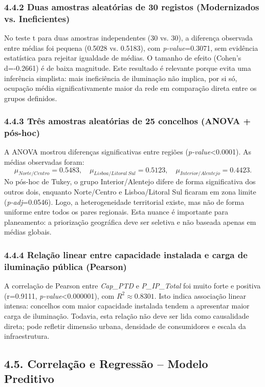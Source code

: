 \subsubsection{4.4.2 Duas amostras aleatórias de 30 registos (Modernizados vs. Ineficientes)}
No teste t para duas amostras independentes (30 vs. 30), a diferença observada entre médias foi pequena (0.5028 vs. 0.5183), com \textit{p-value}=0.3071, sem evidência estatística para rejeitar igualdade de médias. O tamanho de efeito (Cohen's d=-0.2661) é de baixa magnitude. Este resultado é relevante porque evita uma inferência simplista: mais ineficiência de iluminação não implica, por si só, ocupação média significativamente maior da rede em comparação direta entre os grupos definidos.

\subsubsection{4.4.3 Três amostras aleatórias de 25 concelhos (ANOVA + pós-hoc)}
A ANOVA mostrou diferenças significativas entre regiões (\textit{p-value}<0.0001). As médias observadas foram:
\[
\mu_{Norte/Centro} = 0.5483,\quad
\mu_{Lisboa/Litoral\ Sul} = 0.5123,\quad
\mu_{Interior/Alentejo} = 0.4423.
\]
No pós-hoc de Tukey, o grupo Interior/Alentejo difere de forma significativa dos outros dois, enquanto Norte/Centro e Lisboa/Litoral Sul ficaram em zona limite (\textit{p-adj}=0.0546). Logo, a heterogeneidade territorial existe, mas não de forma uniforme entre todos os pares regionais. Esta nuance é importante para planeamento: a priorização geográfica deve ser seletiva e não baseada apenas em médias globais.

\subsubsection{4.4.4 Relação linear entre capacidade instalada e carga de iluminação pública (Pearson)}
A correlação de Pearson entre \textit{Cap\_PTD} e \textit{P\_IP\_Total} foi muito forte e positiva (r=0.9111, \textit{p-value}<0.000001), com \(R^2\approx 0.8301\). Isto indica associação linear intensa: concelhos com maior capacidade instalada tendem a apresentar maior carga de iluminação. Todavia, esta relação não deve ser lida como causalidade direta; pode refletir dimensão urbana, densidade de consumidores e escala da infraestrutura.

\subsection{4.5. Correlação e Regressão -- Modelo Preditivo}

